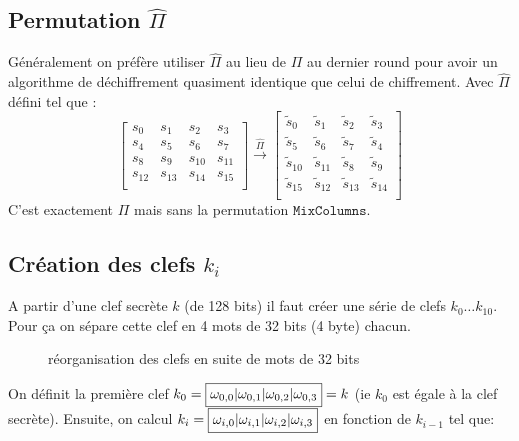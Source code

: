 \documentclass[a4paper, 12pt]{article}
\begin{document}
\subsection{Permutation $\hat{\Pi}$}
Généralement on préfère utiliser $\hat{\Pi}$ au lieu de $\Pi$  au dernier round pour avoir un algorithme de déchiffrement quasiment identique que celui de chiffrement. Avec $\hat{\Pi}$ défini tel que :
$$
\begin{bmatrix}
	s_{0} & s_{1} & s_{2} & s_{3} \\
	s_{4} & s_{5} & s_{6} & s_{7} \\
	s_{8} & s_{9} & s_{10} & s_{11} \\
	s_{12} & s_{13} & s_{14} & s_{15} \\
\end{bmatrix}
\overset{\hat{\Pi}}{\rightarrow}
\begin{bmatrix}
	\tilde{s}_0 & \tilde{s}_1 & \tilde{s}_2 & \tilde{s}_3 \\
	\tilde{s}_5 & \tilde{s}_6 & \tilde{s}_7 & \tilde{s}_4 \\
	\tilde{s}_{10} & \tilde{s}_{11} & \tilde{s}_8 & \tilde{s}_9 \\
	\tilde{s}_{15} & \tilde{s}_{12} & \tilde{s}_{13} & \tilde{s}_{14} \\
\end{bmatrix}
$$
C'est exactement $\Pi$ mais sans la permutation $\mathtt{MixColumns}$. 

\subsection{Création des clefs $k_i$}\label{clefki}
A partir d'une clef secrète $k$ (de 128 bits) il faut créer une série de clefs $k_0\dots k_{10}$.
Pour ça on sépare cette clef en 4 mots de 32 bits (4 byte) chacun.

\begin{figure}[h]
\centering
{}
\caption{réorganisation des clefs en suite de mots de 32 bits}
\label{illu_clef}
\end{figure}
On définit la première clef $k_0 = \fbox{$\omega_{0,0}|\omega_{0,1}|\omega_{0,2}|\omega_{0,3}$} = k$ (ie $k_0$ est égale à la clef secrète). Ensuite, on calcul $k_i = \fbox{$\omega_{i,0}|\omega_{i,1}|\omega_{i,2}|\omega_{i,3}$}$ en fonction de $k_{i-1}$ tel que:
\end{document}

